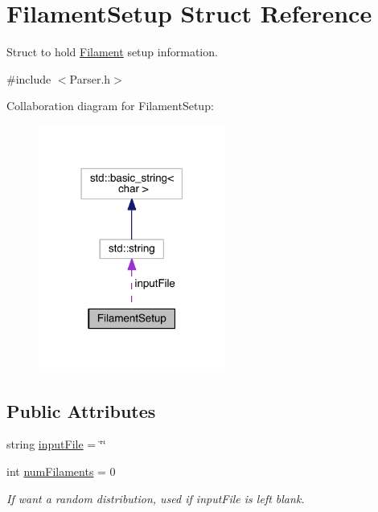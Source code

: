 \hypertarget{structFilamentSetup}{\section{Filament\+Setup Struct Reference}
\label{structFilamentSetup}
}


Struct to hold \hyperlink{classFilament}{Filament} setup information.  




{\ttfamily \#include $<$Parser.\+h$>$}



Collaboration diagram for Filament\+Setup\+:\nopagebreak
\begin{figure}[H]
\begin{center}
\leavevmode
\includegraphics[width=174pt]{structFilamentSetup__coll__graph}
\end{center}
\end{figure}
\subsection*{Public Attributes}
\begin{DoxyCompactItemize}
\item 
string \hyperlink{structFilamentSetup_a242b250121191fe69bceeb99a32de4f7}{input\+File} = \char`\"{}\char`\"{}
\item 
int \hyperlink{structFilamentSetup_a0919341034ce0626e2de5fef2e7a6b66}{num\+Filaments} = 0
\begin{DoxyCompactList}\small\item\em If want a random distribution, used if input\+File is left blank. \end{DoxyCompactList}\end{DoxyCompactItemize}



